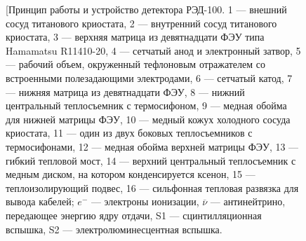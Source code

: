 \begin{figure}[H]	
	\caption[Принцип работы и устройство детектора РЭД-100] {[Принцип работы и устройство детектора РЭД-100. 1 --- внешний сосуд титанового криостата, 2 --- внутренний сосуд титанового криостата, 3 --- верхняя матрица из девятнадцати ФЭУ типа Hamamatsu R11410-20, 4 --- сетчатый анод и электронный затвор, 5 --- рабочий объем, окруженный тефлоновым отражателем со встроенными полезадающими электродами, 6 --- сетчатый катод, 7 --- нижняя матрица из девятнадцати ФЭУ, 8 --- нижний центральный теплосъемник с термосифоном, 9 --- медная обойма для нижней матрицы ФЭУ, 10 --- медный кожух холодного сосуда криостата, 11 --- один из двух боковых теплосъемников с термосифонами, 12 --- медная обойма верхней матрицы ФЭУ, 13 --- гибкий тепловой мост, 14 --- верхний центральный теплосъемник с медным диском, на котором конденсируется ксенон, 15 --- теплоизолирующий подвес, 16 --- сильфонная тепловая развязка для вывода кабелей; $e^-$ --- электроны ионизации, $\overline{\nu}$ --- антинейтрино, передающее энергию ядру отдачи, S1 --- сцинтилляционная вспышка, S2 --- электролюминесцентная вспышка.}
	\label{img:detscheme}
\end{figure}

